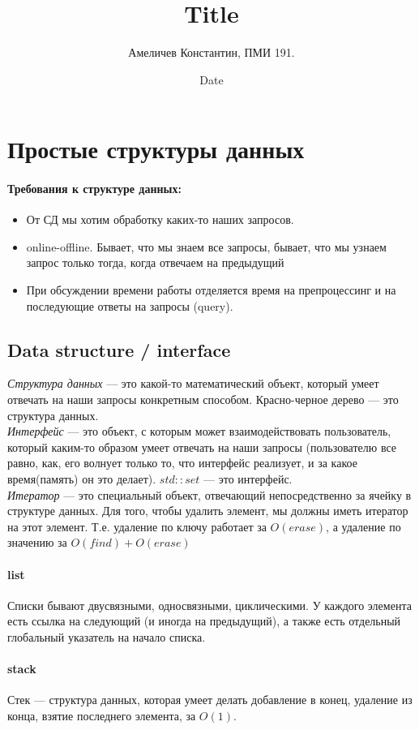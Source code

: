 \documentclass[12pt]{article}
\title{Title}
\author{Амеличев Константин, ПМИ 191.}
\date{Date}
\begin{document}
\section{Простые структуры данных}

\paragraph{Требования к структуре данных:}
\begin{itemize}
    \item От СД мы хотим обработку каких-то наших запросов.
    \item online-offline. Бывает, что мы знаем все запросы, бывает, что мы узнаем запрос только тогда, когда отвечаем на предыдущий
    \item При  обсуждении времени работы отделяется время на препроцессинг и на последующие ответы на запросы (query).
\end{itemize}

\subsection {Data structure / interface}
\hspace{\fill}
\textit{Структура данных} --- это какой-то математический объект, который умеет отвечать на наши запросы конкретным способом. Красно-черное дерево --- это структура данных.
\\
\textit{Интерфейс} --- это объект, с которым может взаимодействовать пользователь, который каким-то образом умеет отвечать на наши запросы (пользователю все равно, как, его волнует только то, что интерфейс реализует, и за какое время(память) он это делает). $std::set$ --- это интерфейс.
\\
\textit{Итератор} --- это специальный объект, отвечающий непосредственно за ячейку в структуре данных. Для того, чтобы удалить элемент, мы должны иметь итератор на этот элемент. Т.е. удаление по ключу работает за $O(erase)$, а удаление по значению за $O(find) + O(erase)$

\paragraph{list}
Списки бывают двусвязными, односвязными, циклическими. У каждого элемента есть ссылка на следующий (и иногда на предыдущий), а также есть отдельный глобальный указатель на начало списка.


\paragraph{stack}
Стек --- структура данных, которая умеет делать добавление в конец, удаление из конца, взятие последнего элемента, за $O(1)$.
\end{document}
